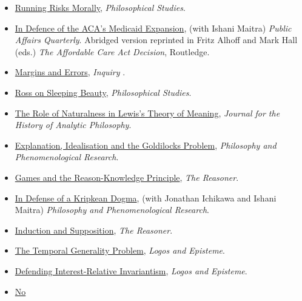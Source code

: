 \documentclass[
  10pt,
  letterpaper,
  DIV=11,
  numbers=noendperiod,
  twoside]{scrartcl}
\begin{document}
\begin{itemize}
\item
  \href{https://brian.weatherson.org/quarto/posts/rrm/running-risks-morally.html}{Running
  Risks Morally}, \emph{Philosophical Studies}.
\item
  \href{https://brian.weatherson.org/quarto/posts/aca/aca-medicaid.html}{In
  Defence of the ACA's Medicaid Expansion}, (with Ishani Maitra)
  \emph{Public Affairs Quarterly}. Abridged version reprinted in Fritz
  Alhoff and Mark Hall (eds.) \emph{The Affordable Care Act Decision},
  Routledge.
\item
  \href{https://brian.weatherson.org/quarto/posts/mae/margins-and-errors.html}{Margins
  and Errors}, \emph{Inquiry} .
\item
  \href{https://brian.weatherson.org/quarto/posts/ross-sleeping-beauty/ross-on-sleeping-beauty.html}{Ross
  on Sleeping Beauty}, \emph{Philosophical Studies}.
\item
  \href{https://brian.weatherson.org/quarto/posts/naturalness/the-role-of-naturalness-in-lewiss-theory-of-meaning.html}{The
  Role of Naturalness in Lewis's Theory of Meaning}, \emph{Journal for
  the History of Analytic Philosophy}.
\item
  \href{https://brian.weatherson.org/quarto/posts/eigp/goldilocks.html}{Explanation,
  Idealisation and the Goldilocks Problem}, \emph{Philosophy and
  Phenomenological Research}.
\item
  \href{https://brian.weatherson.org/quarto/posts/gark/games-and-the-reason-knowledge-principle.html}{Games
  and the Reason-Knowledge Principle}, \emph{The Reasoner}.
\item
  \href{https://brian.weatherson.org/quarto/posts/idakd/in-defense-of-a-kripkean-dogma.html}{In
  Defense of a Kripkean Dogma}, (with Jonathan Ichikawa and Ishani
  Maitra) \emph{Philosophy and Phenomenological Research}.
\item
  \href{https://brian.weatherson.org/quarto/posts/ias/induction-and-supposition.html}{Induction
  and Supposition}, \emph{The Reasoner}.
\item
  \href{https://brian.weatherson.org/quarto/posts/tgp/the-temporal-generality-problem.html}{The
  Temporal Generality Problem}, \emph{Logos and Episteme}.
\item
  \href{https://brian.weatherson.org/quarto/posts/diri/defending-interest-relative-invariantism.html}{Defending
  Interest-Relative Invariantism}, \emph{Logos and Episteme}.
\item
  \href{https://brian.weatherson.org/quarto/posts/nrrtr/no-royal-road-to-relativism.html}{No
}
\end{itemize}
\end{document}
